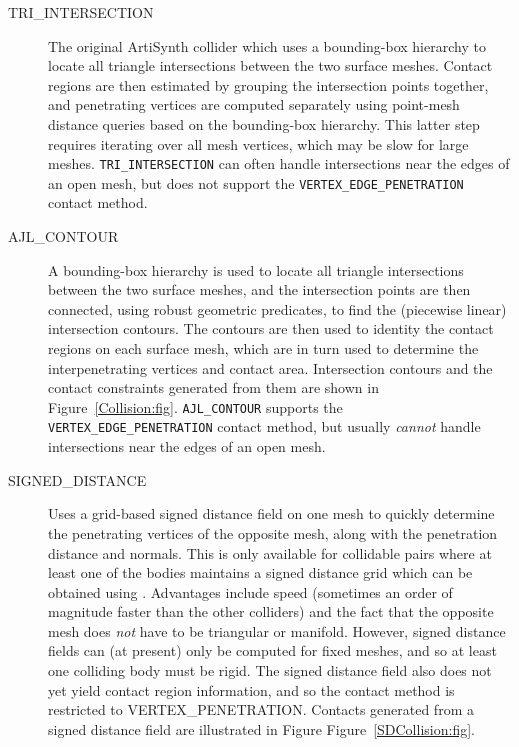 \begin{description}

\item[TRI\_INTERSECTION]\mbox{}

The original ArtiSynth collider which uses a bounding-box hierarchy to
locate all triangle intersections between the two surface
meshes. Contact regions are then estimated by grouping the
intersection points together, and penetrating vertices are computed
separately using point-mesh distance queries based on the bounding-box
hierarchy. This latter step requires iterating over all mesh vertices,
which may be slow for large meshes. {\tt TRI\_INTERSECTION} can often
handle intersections near the edges of an open mesh, but does not
support the {\tt VERTEX\_EDGE\_PENETRATION} contact method.

\item[AJL\_CONTOUR]\mbox{}

A bounding-box hierarchy is used to locate all triangle intersections
between the two surface meshes, and the intersection points are then
connected, using robust geometric predicates, to find the (piecewise
linear) intersection contours.  The contours are then used to identity
the contact regions on each surface mesh, which are in turn used to
determine the interpenetrating vertices and contact area. Intersection
contours and the contact constraints generated from them are shown in
Figure~\ref{Collision:fig}.  {\tt AJL\_CONTOUR} supports the {\tt
VERTEX\_EDGE\_PENETRATION} contact method, but usually {\it cannot}
handle intersections near the edges of an open mesh.

\item[SIGNED\_DISTANCE]\mbox{}

Uses a grid-based signed distance field on one mesh to quickly
determine the penetrating vertices of the opposite mesh, along with
the penetration distance and normals.  This is only available for
collidable pairs where at least one of the bodies maintains a signed
distance grid which can be obtained using
.
Advantages include speed (sometimes an order of magnitude faster than
the other colliders) and the fact that the opposite mesh does {\it
not} have to be triangular or manifold.  However, signed distance
fields can (at present) only be computed for fixed meshes, and so at
least one colliding body must be rigid.  The signed distance field
also does not yet yield contact region information, and so the
contact method is restricted to
%
{VERTEX\_PENETRATION}.
Contacts generated from a signed distance field are illustrated in
Figure Figure~\ref{SDCollision:fig}.


\end{description}
